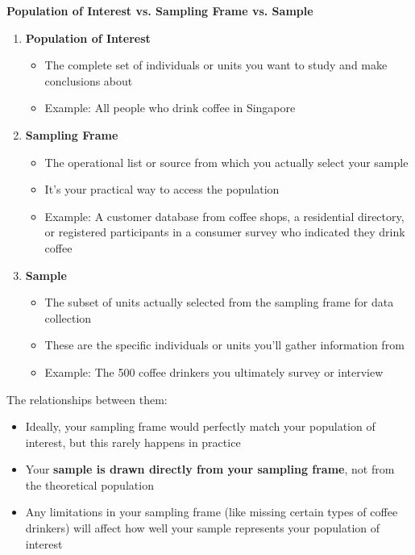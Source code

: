 \documentclass[math,code]{amznotes}
\theoremstyle{remark}
\begin{document}
\textbf{Population of Interest vs. Sampling Frame vs. Sample}
\begin{enumerate}
    \item \textbf{Population of Interest}
    \begin{itemize}
        \item The complete set of individuals or units you want to study and make conclusions about
        \item Example: All people who drink coffee in Singapore
    \end{itemize}
    
    \item \textbf{Sampling Frame}
    \begin{itemize}
        \item The operational list or source from which you actually select your sample
        \item It's your practical way to access the population
        \item Example: A customer database from coffee shops, a residential directory, or registered participants in a consumer survey who indicated they drink coffee
    \end{itemize}
    
    \item \textbf{Sample}
    \begin{itemize}
        \item The subset of units actually selected from the sampling frame for data collection
        \item These are the specific individuals or units you'll gather information from
        \item Example: The 500 coffee drinkers you ultimately survey or interview
    \end{itemize}
\end{enumerate}
The relationships between them:
\begin{itemize}
    \item Ideally, your sampling frame would perfectly match your population of interest, but this rarely happens in practice
    \item Your \textbf{sample is drawn directly from your sampling frame}, not from the theoretical population
    \item Any limitations in your sampling frame (like missing certain types of coffee drinkers) will affect how well your sample represents your population of interest
\end{itemize}
\end{document}
